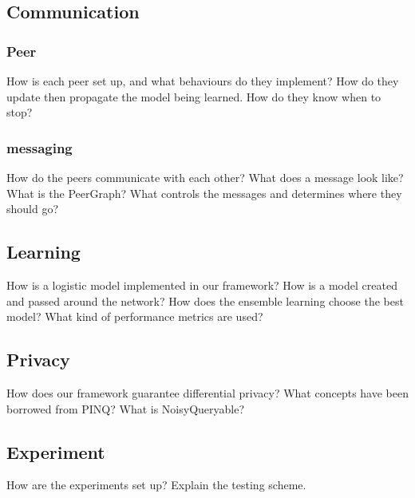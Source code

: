 \subsection{Communication}
\subsubsection{Peer}
How is each peer set up, and what behaviours do they implement? 
How do they update then propagate the model being learned.
How do they know when to stop?
\subsubsection{messaging}
How do the peers communicate with each other?
What does a message look like?
What is the PeerGraph?
What controls the messages and determines where they should go?

\subsection{Learning}
How is a logistic model implemented in our framework?
How is a model created and passed around the network?
How does the ensemble learning choose the best model?
What kind of performance metrics are used?

\subsection{Privacy}
How does our framework guarantee differential privacy?
What concepts have been borrowed from PINQ?
What is NoisyQueryable?

\subsection{Experiment}
How are the experiments set up?
Explain the testing scheme.



\cleardoublepage